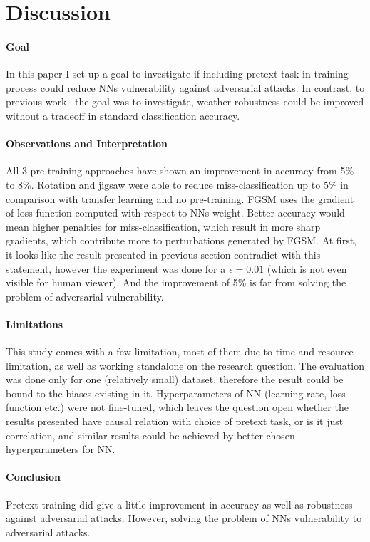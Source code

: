 \section{Discussion}

\paragraph{Goal}
In this paper I set up a goal to investigate if including pretext task in training process could reduce NNs
vulnerability against adversarial attacks.
In contrast, to previous work~\cite{https://doi.org/10.48550/arxiv.1805.12152} the goal was to investigate, weather
robustness could be improved without a tradeoff in standard classification accuracy.

\paragraph{Observations and Interpretation}
All 3 pre-training approaches have shown an improvement in accuracy from 5\% to 8\%.
Rotation and jigsaw were able to reduce miss-classification up to 5\% in comparison with transfer learning and no pre-training.
FGSM uses the gradient of loss function computed with respect to NNs weight.
Better accuracy would mean higher penalties for miss-classification, which result in more sharp gradients, which
contribute more to perturbations generated by FGSM.
At first, it looks like the result presented in previous section contradict with this statement, however
the experiment was done for a $\epsilon = 0.01$ (which is not even visible for human viewer).
And the improvement of 5\% is far from solving the problem of adversarial vulnerability.

\paragraph{Limitations}
This study comes with a few limitation,
most of them due to time and resource limitation, as well as working standalone on the research question.
The evaluation was done only for one (relatively small) dataset, therefore the result could be bound to the biases existing in it.
Hyperparameters of NN (learning-rate, loss function etc.) were not fine-tuned, which leaves the question open whether the
results presented have causal relation with choice of pretext task, or is it just correlation, and similar results could
be achieved by better chosen hyperparameters for NN.

\paragraph{Conclusion}
Pretext training did give a little improvement in accuracy as well as robustness against adversarial attacks.
However, solving the problem of NNs vulnerability to adversarial attacks.

